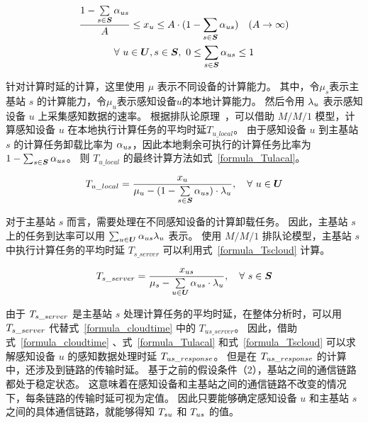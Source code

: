\begin{equation}
\label{formula_xu}
\begin{gathered}
\frac{1 - \sum\limits_{s \in \boldsymbol{S}}{{\alpha}_{us}}}{A} \leq {x}_{u} \leq A \cdot (1 - \sum_{s \in \boldsymbol{S}}{{\alpha}_{us}}) \quad (A \to \infty) \\
\forall\ u \in \boldsymbol{U}, s \in \boldsymbol{S}, \ 0\leq \sum_{s \in \boldsymbol{S}}{{\alpha}_{us}} \leq 1
\end{gathered}
\end{equation}

针对计算时延的计算，这里使用 $\mu$ 表示不同设备的计算能力。
其中，令$\mu_s$表示主基站 $s$ 的计算能力，令$\mu_u$表示感知设备$u$的本地计算能力。
然后令用 ${\lambda}_{u}$ 表示感知设备 $u$ 上采集感知数据的速率。
根据排队论原理~\cite{Queueing:systems}，可以借助 $M/M/1$ 模型，计算感知设备 $u$ 在本地执行计算任务的平均时延$T_{u\_local}$。
由于感知设备 $u$ 到主基站 $s$ 的计算任务卸载比率为 ${\alpha}_{us}$，因此本地剩余可执行的计算任务比率为 $1 - \sum_{s \in \boldsymbol{S}}{\alpha}_{us}$。
则 $T_{u\_local}$ 的最终计算方法如式~\eqref{formula_Tulacal}。

\begin{equation}
  \label{formula_Tulacal}
  {T}_{u\_local} = \frac{{x}_{u}}{{\mu}_{u} - (1 - \sum\limits_{s \in \boldsymbol{S}} {\alpha}_{us}) \cdot {\lambda}_{u}}, \quad \forall \ u \in \boldsymbol{U}
\end{equation}

对于主基站 $s$ 而言，需要处理在不同感知设备的计算卸载任务。
因此，主基站 $s$ 上的任务到达率可以用 $\sum_{u \in \boldsymbol{U}} {\alpha}_{us} {\lambda}_{u}$ 表示。
使用 $M/M/1$ 排队论模型，主基站 $s$ 中执行计算任务的平均时延 $T_{s\_server}$ 可以利用式~\eqref{formula_Tscloud} 计算。

\begin{equation}
\label{formula_Tscloud}
{T}_{s\_server} = \frac{{x}_{us}}{{\mu}_{s} - \sum\limits_{u \in \boldsymbol{U}} {\alpha}_{us} \cdot {\lambda}_{u}}, \quad \forall \ s \in \boldsymbol{S}
\end{equation}

由于 ${T}_{s\_server}$ 是主基站 $s$ 处理计算任务的平均时延，在整体分析时，可以用 ${T}_{s\_server}$ 代替式~\eqref{formula_cloudtime} 中的 $T_{us\_server}$。
因此，借助式~\eqref{formula_cloudtime} 、式~\eqref{formula_Tulacal} 和式~\eqref{formula_Tscloud} 可以求解感知设备 $u$ 的感知数据处理时延 ${T}_{us\_response}$。
但是在 ${T}_{us\_response}$ 的计算中，还涉及到链路的传输时延。
基于之前的假设条件（2），基站之间的通信链路都处于稳定状态。
这意味着在感知设备和主基站之间的通信链路不改变的情况下，每条链路的传输时延可视为定值。
因此只要能够确定感知设备 $u$ 和主基站 $s$ 之间的具体通信链路，就能够得知 ${T}_{su}$ 和 ${T}_{us}$ 的值。

